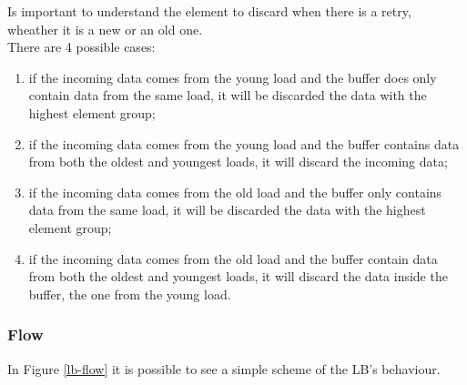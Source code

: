 Is important to understand the element to discard when there is a retry, wheather it is a new or an old one.\\

There are 4 possible cases:
\begin{enumerate}
    \item if the incoming data comes from the young load and the buffer does only contain data from the same load, it will be discarded the data with the highest element group;
    
    \item if the incoming data comes from the young load and the buffer contains data from both the oldest and youngest loads, it will discard the incoming data;
    
    \item if the incoming data comes from the old load and the buffer only contains data from the same load, it will be discarded the data with the highest element group;
    
    \item if the incoming data comes from the old load and the buffer contain data from both the oldest and youngest loads, it will discard the data inside the buffer, the one from the young load.
\end{enumerate}



\subsubsection{Flow}
In Figure \ref{lb-flow} it is possible to see a simple scheme of the LB's behaviour.

